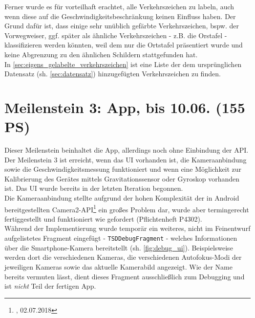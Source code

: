 \documentclass[12pt,a4paper,ngerman,enabledeprecatedfontcommands]{scrreprt}
\begin{document}
Ferner wurde es für vorteilhaft erachtet, alle Verkehrszeichen zu labeln, auch wenn diese auf die Geschwindigkeitsbeschränkung keinen Einfluss haben. Der Grund dafür ist, dass einige sehr unüblich gefärbte Verkehrszeichen, bspw. der Vorwegweiser, ggf. später als ähnliche Verkehrszeichen - z.B. die Orstafel  - klassifizieren werden könnten, weil dem  nur die Ortstafel präsentiert wurde und keine Abgrenzung zu den ähnlichen Schildern stattgefunden hat.\\
In \cref{sec:eigens_gelabelte_verkehrszeichen} ist eine Liste der dem ursprünglichen Datensatz (sh. \cref{sec:datensatz}) hinzugefügten Verkehrszeichen zu finden.\\
 
\section[Meilenstein 3: App]{Meilenstein 3: App, bis 10.06. (155 PS)}
Dieser Meilenstein beinhaltet die \gls{App}, allerdings noch ohne Einbindung der \gls{API}. Der Meilenstein 3 ist erreicht, wenn das \gls{UI} vorhanden ist, die Kameraanbindung sowie die Geschwindigkeitsmessung funktioniert und wenn eine Möglichkeit zur Kalibrierung des Gerätes mittels Gravitationssensor oder Gyroskop vorhanden ist. Das \gls{UI} wurde bereits in der letzten Iteration begonnen.\\

Die Kameraanbindung stellte aufgrund der hohen Komplexität der in Android bereitgestellten Camera2-\gls{API}\footnote{, 02.07.2018} ein großes Problem dar, wurde aber termingerecht fertiggestellt und funktioniert wie gefordert (Pflichtenheft P4302).\\
Während der Implementierung wurde temporär ein weiteres, nicht im Feinentwurf aufgelistetes Fragment eingefügt - \texttt{TSDDebugFragment} - welches Informationen über die \gls{Smartphone}-Kamera bereitstellt (sh. \cref{fig:debug_ui}). Beispielsweise werden dort die verschiedenen Kameras, die verschiedenen Autofokus-Modi der jeweiligen Kameras sowie das aktuelle Kamerabild angezeigt. Wie der Name bereits vermuten lässt, dient dieses Fragment ausschließlich zum Debugging und ist \emph{nicht} Teil der fertigen \gls{App}.\\
\end{document}
